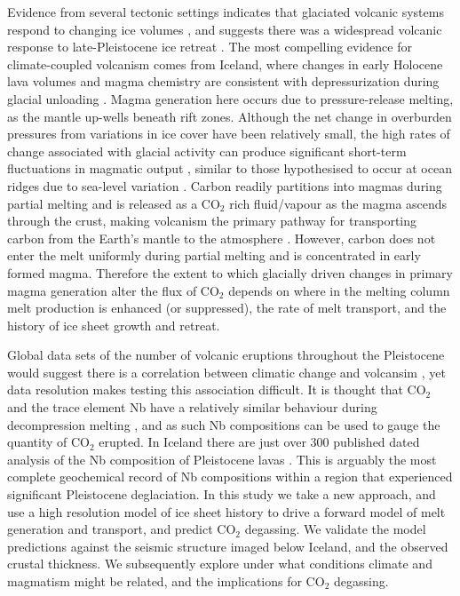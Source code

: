 \documentclass[draft,linenumbers]{agujournal2018}
\begin{document}
Evidence from several tectonic settings indicates that glaciated volcanic systems respond to changing ice volumes \citep{sigvaldason-etal-1992,jull-1996,maclennan-etal-2002,glazner-etal-1999,jellinek-etal-2004,rawson-etal-2016}, and suggests there was a widespread volcanic response to late-Pleistocene ice retreat \citep{huybers-2009}. The most compelling evidence for climate-coupled volcanism comes from Iceland, where changes in early Holocene lava volumes and magma chemistry are consistent with depressurization during glacial unloading \citep{jull-1996,maclennan-etal-2002,sinton-etal-2005}. Magma generation here occurs due to pressure-release melting, as the mantle up-wells beneath rift zones. Although the net change in overburden pressures from variations in ice cover have been relatively small, the high rates of change associated with glacial activity can produce significant short-term fluctuations in magmatic output \citep{jull-1996,pagli-2008,schmidt-etal-2013}, similar to those hypothesised to occur at ocean ridges due to sea-level variation \citep{huybers-2009,lund-2011,crowley-etal-2015,burley-2015}. Carbon readily partitions into magmas during partial melting \citep{rosenthal-etal-2015} and is released as a CO$_{2}$ rich fluid/vapour as the magma ascends through the crust, making volcanism the primary pathway for transporting carbon from the Earth's mantle to the atmosphere \citep{dasgupta-2010}. However, carbon does not enter the melt uniformly during partial melting and is concentrated in early formed magma. Therefore the extent to which glacially driven changes in primary magma generation alter the flux of CO$_{2}$ depends on where in the melting column melt production is enhanced (or suppressed), the rate of melt transport, and the history of ice sheet growth and retreat.

Global data sets of the number of volcanic eruptions throughout the Pleistocene would suggest there is a correlation between climatic change and volcansim \citep{huybers-2009}, yet data resolution makes testing this association difficult. It is thought that CO$_2$ and the trace element Nb have a relatively similar behaviour during decompression melting \citep{saal-etal-2002}, and as such Nb compositions can be used to gauge the quantity of CO$_2$ erupted. In Iceland there are just over 300 published dated analysis of the Nb composition of Pleistocene lavas \citep{gee-etal-1998,eason-etal-2015}. This is arguably the most complete geochemical record of Nb compositions within a region that experienced significant Pleistocene deglaciation. In this study we take a new approach, and use a high resolution model of ice sheet history to drive a forward model of melt generation and transport, and predict CO$_{2}$ degassing. We validate the model predictions against the seismic structure imaged below Iceland, and the observed crustal thickness. We subsequently explore under what conditions climate and magmatism might be related, and the implications for CO$_{2}$ degassing.
\end{document}
